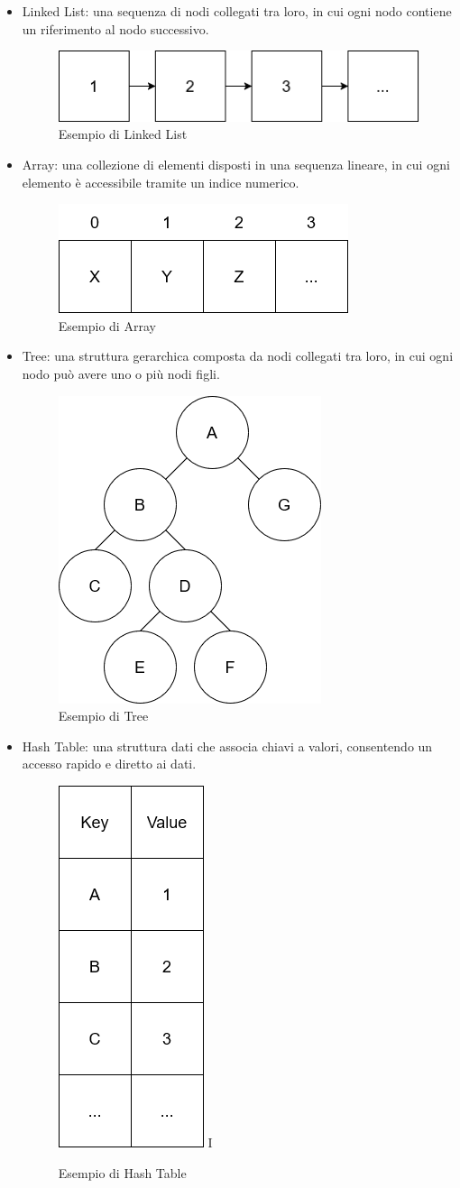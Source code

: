 \documentclass[12pt,a4paper,openright,twoside]{book}
\begin{document}
        \begin{itemize}
            \item Linked List: una sequenza di nodi collegati tra loro, in cui ogni nodo contiene un riferimento al nodo successivo.
            \begin{figure} [h]
                \centering
                \includegraphics[width=.4\linewidth]{figures/LinkedList.png}
                \caption{Esempio di Linked List}
                \label{fig:linked-list}
            \end{figure}
            \item Array: una collezione di elementi disposti in una sequenza lineare, in cui ogni elemento è accessibile tramite un indice numerico.
            \begin{figure} [h]
                \centering
                \includegraphics[width=.3\linewidth]{figures/Array.png}
                \caption{Esempio di Array}
                \label{fig:array}
            \end{figure}
            \item Tree: una struttura gerarchica composta da nodi collegati tra loro, in cui ogni nodo può avere uno o più nodi figli.
            \begin{figure} [h]
                \centering
                \includegraphics[width=.2\linewidth]{figures/Tree.png}
                \caption{Esempio di Tree}
                \label{fig:generic-tree}
            \end{figure}
            \item Hash Table: una struttura dati che associa chiavi a valori, consentendo un accesso rapido e diretto ai dati.
            \begin{figure} [h]
                \centering
                \includegraphics[width=.15\linewidth]{figures/HashTable.png}
I               \caption{Esempio di Hash Table}
                \label{fig:hash-table}
            \end{figure}
        \end{itemize}
\end{document}
